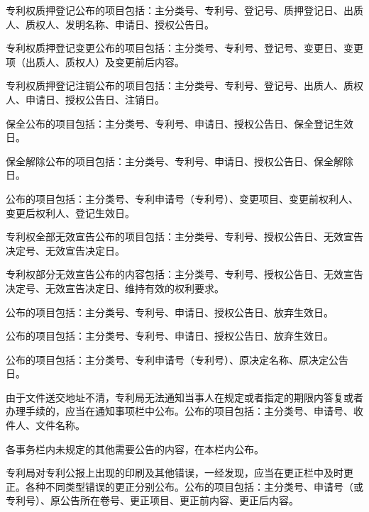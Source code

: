 专利权质押登记公布的项目包括：主分类号、专利号、登记号、质押登记日、出质人、质权人、发明名称、申请日、授权公告日。

专利权质押登记变更公布的项目包括：主分类号、专利号、登记号、变更日、变更项（出质人、质权人）及变更前后内容。

专利权质押登记注销公布的项目包括：主分类号、专利号、登记号、出质人、质权人、申请日、授权公告日、注销日。

保全公布的项目包括：主分类号、专利号、申请日、授权公告日、保全登记生效日。

保全解除公布的项目包括：主分类号、专利号、申请日、授权公告日、保全解除日。

公布的项目包括：主分类号、专利申请号（专利号）、变更项目、变更前权利人、变更后权利人、登记生效日。

专利权全部无效宣告公布的项目包括：主分类号、专利号、授权公告日、无效宣告决定号、无效宣告决定日。

专利权部分无效宣告公布的内容包括：主分类号、专利号、授权公告日、无效宣告决定号、无效宣告决定日、维持有效的权利要求。

公布的项目包括：主分类号、专利号、申请日、授权公告日、放弃生效日。

公布的项目包括：主分类号、专利号、申请日、授权公告日、放弃生效日。

公布的项目包括：主分类号、专利申请号（专利号）、原决定名称、原决定公告日。

由于文件送交地址不清，专利局无法通知当事人在规定或者指定的期限内答复或者办理手续的，应当在通知事项栏中公布。公布的项目包括：主分类号、申请号、收件人、文件名称。

各事务栏内未规定的其他需要公告的内容，在本栏内公布。

专利局对专利公报上出现的印刷及其他错误，一经发现，应当在更正栏中及时更正。各种不同类型错误的更正分别公布。公布的项目包括：主分类号、申请号（或专利号）、原公告所在卷号、更正项目、更正前内容、更正后内容。

